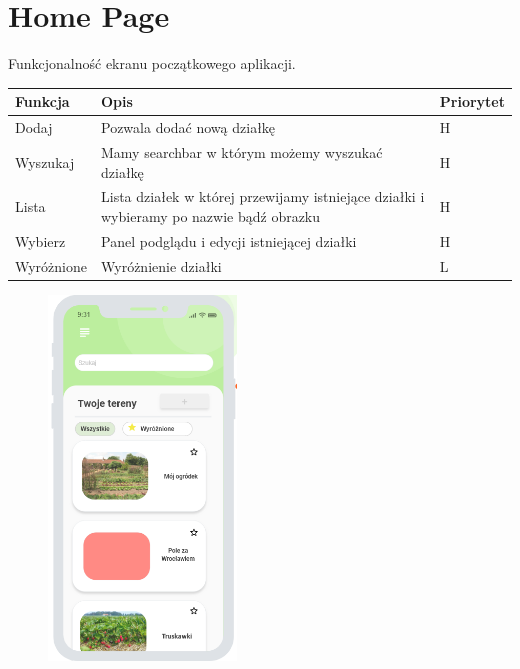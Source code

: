 \newpage
\section{Home Page}
Funkcjonalność ekranu początkowego aplikacji.
\begin{table}[H]
    \begin{center}
    \label{tab:table}
    \begin{tabularx}{1.1\textwidth} { 
    >{\raggedright\arraybackslash}X 
    | >{\raggedright\arraybackslash}X 
    | >{\raggedleft\arraybackslash}X}
    \textbf{Funkcja} & \textbf{Opis} & \textbf{Priorytet}\\
    \hline
    Dodaj&Pozwala dodać nową działkę&H\\
    \hline
    Wyszukaj&Mamy searchbar w którym możemy wyszukać działkę&H\\
    \hline
    Lista&Lista działek w której przewijamy istniejące działki i wybieramy po nazwie bądź obrazku&H\\
    \hline
    Wybierz&Panel podglądu i edycji istniejącej działki&H\\
    \hline
    Wyróżnione&Wyróżnienie działki&L\\
    \hline
    \end{tabularx}
    \end{center}
    \end{table}

\begin{figure}[htp]
    \centering
    \includegraphics[width=5cm]{cibka.png}
\end{figure}